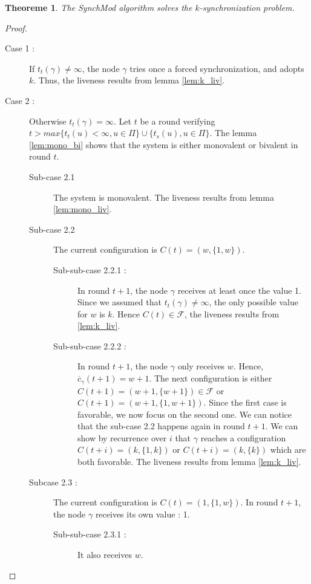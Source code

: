 \documentclass{article}
\newtheorem{theorem}{Theoreme}
\newcommand{\cent}{\gamma}
\newcommand{\ts}{t_{s}}
\newcommand{\try}{t_{t}}
\begin{document}
\begin{theorem}
	The SynchMod algorithm solves the $k$-synchronization problem.
\end{theorem}
\begin{proof}
	\begin{description}
		\item[Case 1 : ] If $\try(\cent) \neq \infty$, the node $\cent$ tries once a forced synchronization, and adopts $k$.
			Thus, the liveness results from lemma \ref{lem:k_liv}.

		\item[Case 2 :] Otherwise $\try(\cent) = \infty$.
			Let $t$ be a round verifying $t > max \{\try(u) < \infty, u \in \Pi\} \cup \{\ts(u), u \in \Pi\}$.
			The lemma \ref{lem:mono_bi} shows that the system is either monovalent or bivalent in round $t$.
			\begin{description}
				\item[Sub-case 2.1] The system is monovalent. The liveness results from lemma \ref{lem:mono_liv}.
				\item[Sub-case 2.2] The current configuration is $C(t) = (w, \{1, w\})$.
					\begin{description}
						\item[Sub-sub-case 2.2.1 : ] In round $t+1$, the node $\cent$ receives at least once
							the value 1.
							Since we assumed that $\try(\cent) \neq \infty$, the only possible value for $w$ is $k$.
							Hence $C(t) \in \mathcal{F}$, the liveness results from \ref{lem:k_liv}.
						\item[Sub-sub-case 2.2.2 : ] In round $t+1$, the node $\cent$ only receives $w$.
							Hence, $\overline{c}_\cent(t+1) = w+1$.
							The next configuration is either $C(t+1) = (w+1, \{w+1\}) \in \mathcal{F}$ or $C(t+1) = (w+1, \{1, w+1\})$.
							Since the first case is favorable, we now focus on the second one.
							We can notice that the sub-case 2.2 happens again in round $t+1$.
							We can show by recurrence over $i$ that $\cent$ reaches a configuration $C(t+i) = (k, \{1, k\})$ or $C(t+i) = (k, \{k\})$ which are both favorable.
							The liveness results from lemma \ref{lem:k_liv}.
					\end{description}
				\item[Subcase 2.3 : ] The current configuration is $C(t) = (1, \{1, w\})$.
					In round $t+1$, the node $\cent$ receives its own value : 1.
					\begin{description}
						\item[Sub-sub-case 2.3.1 : ] It also receives $w$.

\end{description}
\end{description}
\end{description}
\end{proof}
\end{document}
